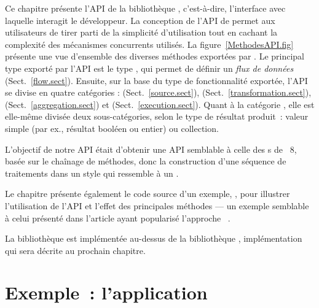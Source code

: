 Ce chapitre pr\'esente l'API de la biblioth\`eque \ppff,  c'est-\`a-dire, l'interface avec laquelle interagit le d\'eveloppeur. La conception de l'API de \ppff{} permet aux utilisateurs de tirer parti de la simplicit\'e d'utilisation tout en cachant la complexit\'e des m\'ecanismes concurrents utilis\'es. La figure~\ref{MethodesAPI.fig} pr\'esente une vue d'ensemble des diverses m\'ethodes export\'ees par \ppff.
%
Le principal type exporté par l'API est le type , qui permet de définir un \emph{flux de données} (Sect.~\ref{flow.sect}).
%
Ensuite, sur la base du type de fonctionnalit\'e export\'ee, l'API se divise en quatre cat\'egories :   (Sect.~\ref{source.sect}),  (Sect.~\ref{transformation.sect}),   (Sect.~\ref{aggregation.sect}) et  (Sect.~\ref{execution.sect}). Quant \`a la cat\'egorie , elle est elle-m\^eme divis\'ee deux sous-cat\'egories, selon le type de r\'esultat produit~: valeur simple (par ex., r\'esultat bool\'een ou entier) ou collection.

L'objectif de notre API \'etait d'obtenir une API semblable \`a celle des s de ~8, bas\'ee sur le cha\^inage de m\'ethodes, donc la construction d'une séquence de traitements dans un style qui ressemble \`a un .


Le chapitre pr\'esente \'egalement le code source d'un exemple, , pour illustrer l'utilisation de l'API et l'effet des principales m\'ethodes --- un exemple semblable à celui présenté dans l'article ayant popularisé l'approche ~\citep{DeanGhe04}.

La biblioth\`eque \PpFf{} est impl\'ement\'ee au-dessus de la biblioth\`eque , impl\'ementation qui sera d\'ecrite au prochain chapitre.




\section{Exemple~: l'application }
\label{descriptionWordCount.sect}


